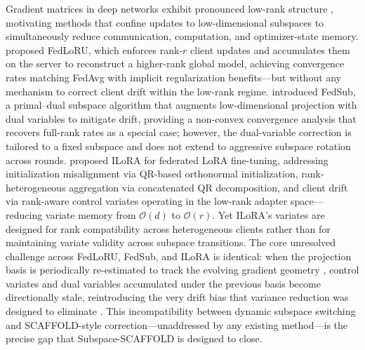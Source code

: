 \documentclass[11pt]{article}
\begin{document}
Gradient matrices in deep networks exhibit pronounced low-rank structure \citep{Vogels2019PowerSGDPL}, motivating methods that confine updates to low-dimensional subspaces to simultaneously reduce communication, computation, and optimizer-state memory. \citet{Park2024CommunicationEfficientFL} proposed FedLoRU, which enforces rank-$r$ client updates and accumulates them on the server to reconstruct a higher-rank global model, achieving convergence rates matching FedAvg with implicit regularization benefits---but without any mechanism to correct client drift within the low-rank regime. \citet{zhang2025efficient} introduced FedSub, a primal--dual subspace algorithm that augments low-dimensional projection with dual variables to mitigate drift, providing a non-convex convergence analysis that recovers full-rank rates as a special case; however, the dual-variable correction is tailored to a fixed subspace and does not extend to aggressive subspace rotation across rounds. \citet{Zhou2025ILoRAFL} proposed ILoRA for federated LoRA fine-tuning, addressing initialization misalignment via QR-based orthonormal initialization, rank-heterogeneous aggregation via concatenated QR decomposition, and client drift via rank-aware control variates operating in the low-rank adapter space---reducing variate memory from $\mathcal{O}(d)$ to $\mathcal{O}(r)$. Yet ILoRA's variates are designed for rank compatibility across heterogeneous clients rather than for maintaining variate validity across subspace transitions. The core unresolved challenge across FedLoRU, FedSub, and ILoRA is identical: when the projection basis is periodically re-estimated to track the evolving gradient geometry \citep{chen2025greedy, Vogels2019PowerSGDPL}, control variates and dual variables accumulated under the previous basis become directionally stale, reintroducing the very drift bias that variance reduction was designed to eliminate \citep{karimireddy2020scaffold, Huang2023StochasticCA}. This incompatibility between dynamic subspace switching and SCAFFOLD-style correction---unaddressed by any existing method---is the precise gap that Subspace-SCAFFOLD is designed to close.



\end{document}
